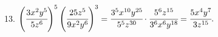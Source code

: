 13. $\left(\cfrac{3x^2y^5}{5z^6}\right)^5\left(\cfrac{25z^5}{9x^2y^6}\right)^3=\cfrac{3^5x^{10}y^{25}}{5^5z^{30}}\cdot\cfrac{5^6z^{15}}{3^6x^6y^{18}}=\cfrac{5x^4y^7}{3z^{15}}.$\\
